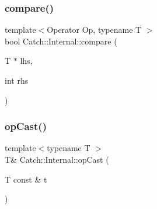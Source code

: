 \mbox{\label{namespace_catch_1_1_internal_a95361ddae55c9a390e6510bdadccb1fc}} 
\subsubsection{\texorpdfstring{compare()}{compare()}\hspace{0.1cm}{\footnotesize\ttfamily [17/17]}}
{\footnotesize\ttfamily template$<$Operator Op, typename T $>$ \\
bool Catch\+::\+Internal\+::compare (\begin{DoxyParamCaption}\item[{T $\ast$}]{lhs,  }\item[{int}]{rhs }\end{DoxyParamCaption})}

\mbox{\label{namespace_catch_1_1_internal_adde98c1a650e94615e2b37ab0b3734e2}} 
\subsubsection{\texorpdfstring{op\+Cast()}{opCast()}}
{\footnotesize\ttfamily template$<$typename T $>$ \\
T\& Catch\+::\+Internal\+::op\+Cast (\begin{DoxyParamCaption}\item[{T const \&}]{t }\end{DoxyParamCaption})\hspace{0.3cm}{\ttfamily [inline]}}

